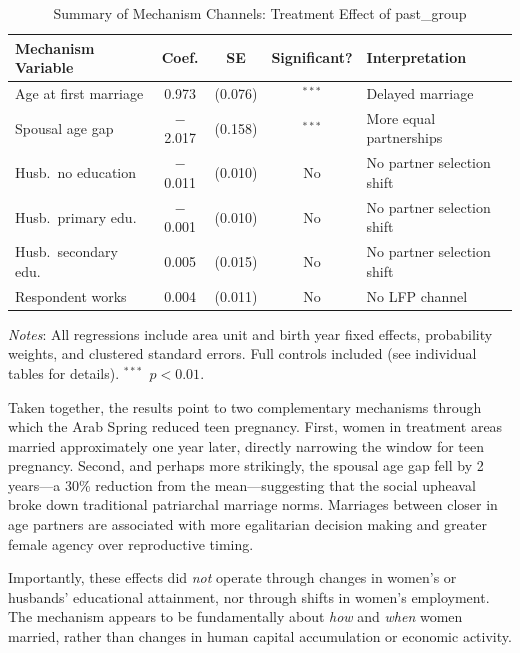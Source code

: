 \documentclass[12pt,a4paper]{article}
\begin{document}
\begin{table}[H]
\centering
\begin{threeparttable}
\caption{Summary of Mechanism Channels: Treatment Effect of past\_group}
\label{tab:mech_summary}
\small
\begin{tabular}{@{}lcccl@{}}
\toprule
Mechanism Variable & Coef. & SE & Significant? & Interpretation \\
\midrule
Age at first marriage & 0.973 & (0.076) & $^{***}$ & Delayed marriage \\
Spousal age gap       & $-$2.017 & (0.158) & $^{***}$ & More equal partnerships \\
Husb.\ no education   & $-$0.011 & (0.010) & No & No partner selection shift \\
Husb.\ primary edu.   & $-$0.001 & (0.010) & No & No partner selection shift \\
Husb.\ secondary edu. & 0.005 & (0.015) & No & No partner selection shift \\
Respondent works      & 0.004 & (0.011) & No & No LFP channel \\
\bottomrule
\end{tabular}
\begin{tablenotes}[flushleft]
\footnotesize
\item \textit{Notes}: All regressions include area unit and birth year fixed effects, probability weights, and clustered standard errors. Full controls included (see individual tables for details). $^{***}$~$p<0.01$.
\end{tablenotes}
\end{threeparttable}
\end{table}

\noindent Taken together, the results point to two complementary mechanisms through which the Arab Spring reduced teen pregnancy. First, women in treatment areas married approximately one year later, directly narrowing the window for teen pregnancy. Second, and perhaps more strikingly, the spousal age gap fell by 2 years---a 30\% reduction from the mean---suggesting that the social upheaval broke down traditional patriarchal marriage norms. Marriages between closer in age partners are associated with more egalitarian decision making and greater female agency over reproductive timing.
\vspace{0.25cm}

Importantly, these effects did \textit{not} operate through changes in women's or husbands' educational attainment, nor through shifts in women's employment. The mechanism appears to be fundamentally about \textit{how} and \textit{when} women married, rather than changes in human capital accumulation or economic activity.
\vspace{0.25cm}
\end{document}
